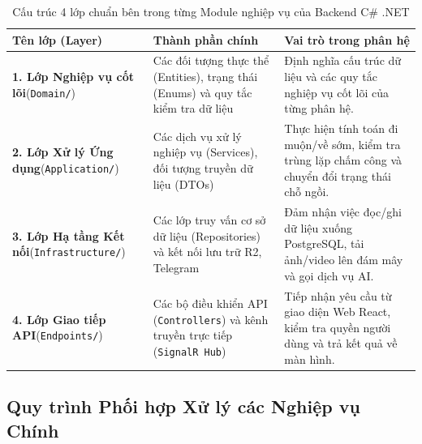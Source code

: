 \documentclass[12pt,a4paper]{article}
\begin{document}
\begin{table}[H]
\centering
\caption{Cấu trúc 4 lớp chuẩn bên trong từng Module nghiệp vụ của Backend C\# .NET}
\begin{tabular}{|L{\tabcolsep\relax}|L{\tabcolsep\relax}|L{\tabcolsep\relax}|}
\hline
{}
\textbf{Tên lớp (Layer)} & \textbf{Thành phần chính} & \textbf{Vai trò trong phân hệ} \\
\hline
\textbf{1. Lớp Nghiệp vụ cốt lõi}\newline (\texttt{Domain/}) & Các đối tượng thực thể (Entities), trạng thái (Enums) và quy tắc kiểm tra dữ liệu & Định nghĩa cấu trúc dữ liệu và các quy tắc nghiệp vụ cốt lõi của từng phân hệ. \\
\hline
{}
\textbf{2. Lớp Xử lý Ứng dụng}\newline (\texttt{Application/}) & Các dịch vụ xử lý nghiệp vụ (Services), đối tượng truyền dữ liệu (DTOs) & Thực hiện tính toán đi muộn/về sớm, kiểm tra trùng lặp chấm công và chuyển đổi trạng thái chỗ ngồi. \\
\hline
\textbf{3. Lớp Hạ tầng Kết nối}\newline (\texttt{Infrastructure/}) & Các lớp truy vấn cơ sở dữ liệu (Repositories) và kết nối lưu trữ R2, Telegram & Đảm nhận việc đọc/ghi dữ liệu xuống PostgreSQL, tải ảnh/video lên đám mây và gọi dịch vụ AI. \\
\hline
{}
\textbf{4. Lớp Giao tiếp API}\newline (\texttt{Endpoints/}) & Các bộ điều khiển API (\texttt{Controllers}) và kênh truyền trực tiếp (\texttt{SignalR Hub}) & Tiếp nhận yêu cầu từ giao diện Web React, kiểm tra quyền người dùng và trả kết quả về màn hình. \\
\hline
\end{tabular}
\end{table}

\subsection{Quy trình Phối hợp Xử lý các Nghiệp vụ Chính}
\end{document}
